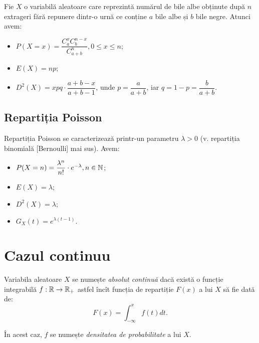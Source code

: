 \indent\indent Fie $ X $ o variabilă aleatoare care reprezintă numărul de bile albe
obținute după $ n $ extrageri fără repunere dintr-o urnă ce conține $ a $ bile albe
și $ b $ bile negre. Atunci avem:
\begin{itemize}
\item $ P(X = x) = \dfrac{C_a^x C_b^{n-x}}{C_{a + b}^n}, 0 \leq x \leq n $;
\item $ E(X) = np $;
\item $ D^2(X) = xpq \cdot \dfrac{a + b - x}{a + b - 1} $, unde $ p = \dfrac{a}{a+b}$,
  iar $ q = 1 - p = \dfrac{b}{a + b} $.
\end{itemize}


\subsection{Repartiția Poisson}

\indent\indent Repartiția Poisson se caracterizează printr-un parametru $ \lambda > 0 $
(v. repartiția binomială [Bernoulli] mai sus). Avem:
\begin{itemize}
\item $ P(X = n) = \dfrac{\lambda^n}{n!} \cdot e^{-\lambda}, n \in \mathbb{N} $;
\item $ E(X) = \lambda $;
\item $ D^2(X) = \lambda $;
\item $ G_X(t) = e^{\lambda(t - 1)} $.
\end{itemize}


\section{Cazul continuu}


\begin{definition}\label{def:va-cont}
  Variabila aleatoare $ X $ se numește \emph{absolut continuă} dacă
  există o funcție integrabilă $ f : \mathbb{R} \to \mathbb{R}_+ $ astfel încît funcția
  de repartiție $ F(x) $ a lui $ X $ să fie dată de:
  \[
    F(x) = \int_{-\infty}^x f(t) dt.
  \]

  În acest caz, $ f $ se numește \emph{densitatea de probabilitate} a lui $ X $.
\end{definition}

